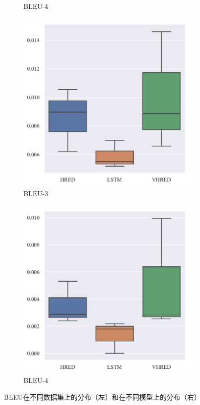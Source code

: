 \begin{figure}[H]
\begin{subfigure}{0.24\linewidth}
        \caption{BLEU-4}
    \end{subfigure}%
    \begin{subfigure}{0.24\linewidth}
        \centering
        \includegraphics[width=\linewidth]{figure/boxplot/model/bleu_3/plot.pdf}
        \caption{BLEU-3}
    \end{subfigure}%
    \begin{subfigure}{0.24\linewidth}
        \centering
        \includegraphics[width=\linewidth]{figure/boxplot/model/bleu_4/plot.pdf}
        \caption{BLEU-4}
    \end{subfigure}
    \centering
    \caption{BLEU在不同数据集上的分布（左）和在不同模型上的分布（右）}
    \label{fig:BLEU_dataset}
\end{figure}
